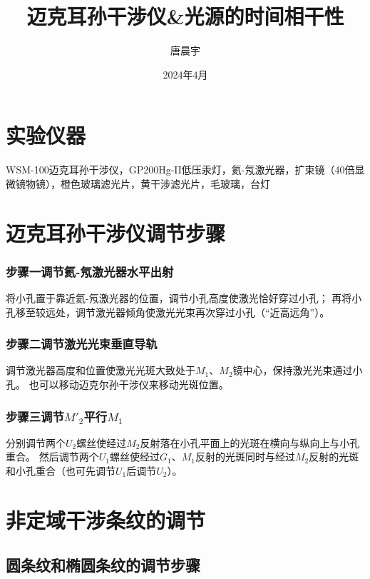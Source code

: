 \documentclass[12pt, a4paper]{ctexart}
\begin{document}
\title{迈克耳孙干涉仪\&光源的时间相干性}
\author{唐晨宇 }
\date{2024年4月}

\maketitle

\tableofcontents

\clearpage

\section*{实验仪器}

WSM-100迈克耳孙干涉仪，GP200Hg-II低压汞灯，氦-氖激光器，扩束镜（40倍显微镜物镜），橙色玻璃滤光片，黄干涉滤光片，毛玻璃，台灯

\section{迈克耳孙干涉仪调节步骤}

\subsubsection*{步骤一\quad 调节氦-氖激光器水平出射}
将小孔置于靠近氦-氖激光器的位置，调节小孔高度使激光恰好穿过小孔；
再将小孔移至较远处，调节激光器倾角使激光光束再次穿过小孔（“近高远角”）。

\subsubsection*{步骤二\quad 调节激光光束垂直导轨}
调节激光器高度和位置使激光光斑大致处于$M_1$、$M_2$镜中心，保持激光光束通过小孔。
也可以移动迈克尔孙干涉仪来移动光斑位置。

\subsubsection*{步骤三\quad 调节$M'_2$平行$M_1$}
分别调节两个$U_2$螺丝使经过$M_2$反射落在小孔平面上的光斑在横向与纵向上与小孔重合。
然后调节两个$U_1$螺丝使经过$G_1$、$M_1$反射的光斑同时与经过$M_2$反射的光斑和小孔重合（也可先调节$U_1$后调节$U_2$）。

\section{非定域干涉条纹的调节}
\subsection{圆条纹和椭圆条纹的调节步骤}
\end{document}
